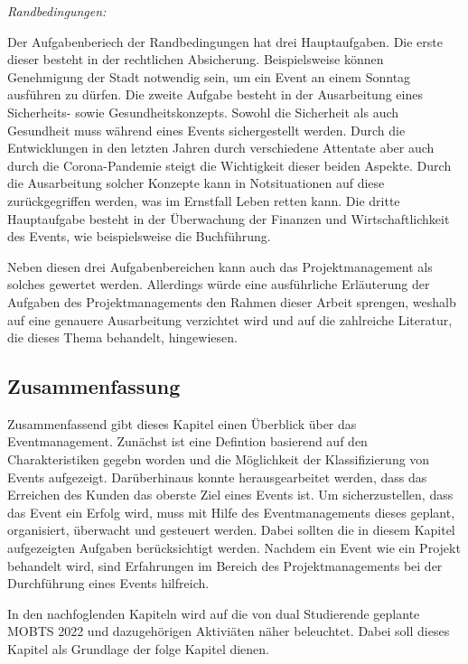 \textit{Randbedingungen:}

Der Aufgabenberiech der Randbedingungen hat drei Hauptaufgaben.
Die erste dieser besteht in der rechtlichen Absicherung.
Beispielsweise können Genehmigung der Stadt notwendig sein, um ein Event an einem Sonntag ausführen zu dürfen.
Die zweite Aufgabe besteht in der Ausarbeitung eines Sicherheits- sowie Gesundheitskonzepts.
Sowohl die Sicherheit als auch Gesundheit muss während eines Events sichergestellt werden.
Durch die Entwicklungen in den letzten Jahren durch verschiedene Attentate aber auch durch die Corona-Pandemie steigt die Wichtigkeit dieser beiden Aspekte.
Durch die Ausarbeitung solcher Konzepte kann in Notsituationen auf diese zurückgegriffen werden, was im Ernstfall Leben retten kann.
Die dritte Hauptaufgabe besteht in der Überwachung der Finanzen und Wirtschaftlichkeit des Events, wie beispielsweise die Buchführung.\autocite[Vgl.][S. 169]{Holzbaur.2002}

Neben diesen drei Aufgabenbereichen kann auch das Projektmanagement als solches gewertet werden.
Allerdings würde eine ausführliche Erläuterung der Aufgaben des Projektmanagements den Rahmen dieser Arbeit sprengen, weshalb auf eine genauere Ausarbeitung verzichtet wird und auf die zahlreiche Literatur, die dieses Thema behandelt, hingewiesen.

\subsection{Zusammenfassung}
Zusammenfassend gibt dieses Kapitel einen Überblick über das Eventmanagement. 
Zunächst ist eine Defintion basierend auf den Charakteristiken gegebn worden und die Möglichkeit der Klassifizierung von Events aufgezeigt. 
Darüberhinaus konnte herausgearbeitet werden, dass das Erreichen des Kunden das oberste Ziel eines Events ist. 
Um sicherzustellen, dass das Event ein Erfolg wird, muss mit Hilfe des Eventmanagements dieses geplant, organisiert, überwacht und gesteuert werden.
Dabei sollten die in diesem Kapitel aufgezeigten Aufgaben berücksichtigt werden.  
Nachdem ein Event wie ein Projekt behandelt wird, sind Erfahrungen im Bereich des Projektmanagements bei der Durchführung eines Events hilfreich.

In den nachfoglenden Kapiteln wird auf die von dual Studierende geplante MOBTS 2022 und dazugehörigen Aktiviäten näher beleuchtet. Dabei soll dieses Kapitel als Grundlage der folge Kapitel dienen. 
